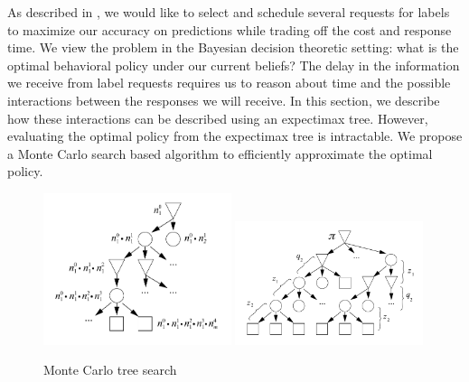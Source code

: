 As described in , we would like to select and schedule several requests for labels to maximize our accuracy on predictions while trading off the cost and response time. 
We view the problem in the Bayesian decision theoretic setting: what is the optimal behavioral policy under our current beliefs?
The delay in the information we receive from label requests requires us to reason about time and the possible interactions between the responses we will receive.
In this section, we describe how these interactions can be described using an expectimax tree.
However, evaluating the optimal policy from the expectimax tree is intractable.
We propose a Monte Carlo search based algorithm to efficiently approximate the optimal policy.


\begin{figure}
  \includegraphics[width=0.49\textwidth,height=0.23\textheight,keepaspectratio]{figures/game-tree.pdf}
  \hfill
  \includegraphics[width=0.49\textwidth,height=0.23\textheight,keepaspectratio]{figures/lookahead-one.pdf}
  \caption{Monte Carlo tree search}
\label{fig:mcts}
\end{figure}

